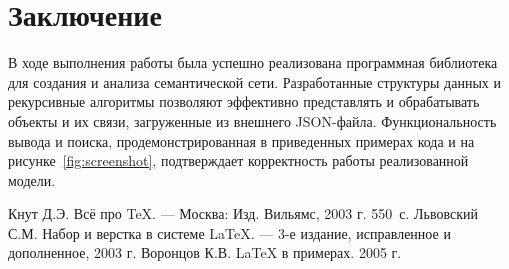 \documentclass[12pt,a4paper]{scrartcl}
\begin{document}
	\section{Заключение}
	\label{sec:conclusion}
	В ходе выполнения работы была успешно реализована программная библиотека для создания и анализа семантической сети. Разработанные структуры данных и рекурсивные алгоритмы позволяют эффективно представлять и обрабатывать объекты и их связи, загруженные из внешнего JSON-файла. Функциональность вывода и поиска, продемонстрированная в приведенных примерах кода и на рисунке~\ref{fig:screenshot}, подтверждает корректность работы реализованной модели.
	
	\begin{thebibliography}{9}
		Кнут Д.Э. Всё про \TeX. \newblock --- Москва: Изд. Вильямс, 2003 г. 550~с.
		Львовский С.М. Набор и верстка в системе \LaTeX{}. \newblock --- 3-е издание, исправленное и дополненное, 2003 г.
		Воронцов К.В. \LaTeX{} в примерах. 2005 г.
	\end{thebibliography}
	
\end{document}
